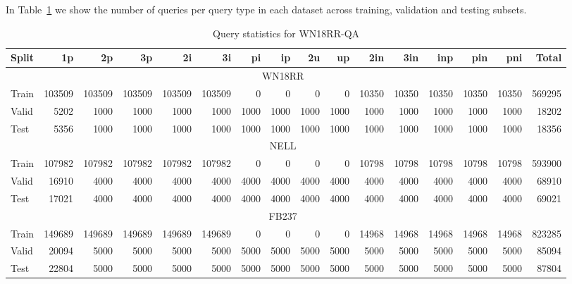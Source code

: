 \documentclass[runningheads]{llncs}
\begin{document}
In Table~\ref{tab:datasets} we show the number of queries per query
type in each dataset across training, validation and testing subsets.
\begin{table}[htbp]
\centering
\caption{Query statistics for WN18RR-QA}
\label{tab:datasets}
\begin{adjustbox}{width=0.9\textwidth}
\begin{tabular}{lrrrrrrrrrrrrrrr}
\toprule
  Split   &     1p &     2p &    3p &     2i &   3i &     pi &    ip &   2u &   up &   2in &   3in &   inp &   pin &   pni &   Total \\
  \midrule
  \midrule
          &   \multicolumn{14}{c}{WN18RR} \\
  \cmidrule{2-16}
Train   & 103509 & 103509 & 103509 & 103509 & 103509 &    0 &    0 &        0 &        0 & 10350 & 10350 & 10350 & 10350 & 10350 &  569295 \\
 Valid   &   5202 &   1000 &   1000 &   1000 &   1000 & 1000 & 1000 &     1000 &     1000 &  1000 &  1000 &  1000 &  1000 &  1000 &   18202 \\
 Test    &   5356 &   1000 &   1000 &   1000 &   1000 & 1000 & 1000 &     1000 &     1000 &  1000 &  1000 &  1000 &  1000 &  1000 &   18356 \\
  \midrule
  \midrule
          &   \multicolumn{14}{c}{NELL} \\
  \cmidrule{2-16}
  Train   & 107982 & 107982 & 107982 & 107982 & 107982 &    0 &    0 &        0 &        0 & 10798 & 10798 & 10798 & 10798 & 10798 &  593900 \\
 Valid   &  16910 &   4000 &   4000 &   4000 &   4000 & 4000 & 4000 &     4000 &     4000 &  4000 &  4000 &  4000 &  4000 &  4000 &   68910 \\
 Test    &  17021 &   4000 &   4000 &   4000 &   4000 & 4000 & 4000 &     4000 &     4000 &  4000 &  4000 &  4000 &  4000 &  4000 &   69021 \\
  \midrule
  \midrule
          &   \multicolumn{14}{c}{FB237} \\
  \cmidrule{2-16}
  Train   & 149689 & 149689 & 149689 & 149689 & 149689 &     0 &     0 &        0 &        0 & 14968 & 14968 & 14968 & 14968 & 14968 &  823285 \\
 Valid   &  20094 &   5000 &   5000 &   5000 &   5000 &  5000 &  5000 &     5000 &     5000 &  5000 &  5000 &  5000 &  5000 &  5000 &   85094 \\
 Test    &  22804 &   5000 &   5000 &   5000 &   5000 &  5000 &  5000 &     5000 &     5000 &  5000 &  5000 &  5000 &  5000 &  5000 &   87804 \\
   \bottomrule
\end{tabular}
\end{adjustbox}
\end{table}
\end{document}
